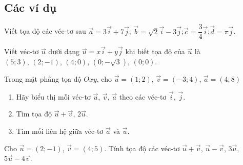 \subsection{Các ví dụ}
\begin{vd}%
Viết tọa độ các véc-tơ sau
$\vec{a}=3\vec{i}+7\vec{j}$; \quad $\vec{b}=\sqrt{2}\vec{i}-3\vec{j}$;\quad $\vec{c}=\dfrac{3}{4}\vec{i}$;\quad$\vec{d}=\pi\vec{j}$.
\end{vd}
\begin{vd}%
Viết véc-tơ $\vec{u}$ dưới dạng $\vec{u}=x\vec{i}+y\vec{j}$ khi biết tọa độ của $\vec{u}$ là\\
$(5;3)$, $(2;-1)$, $(4;0)$, $\left(0;-\sqrt{3}\right)$, $(0;0)$.
\end{vd}
\begin{vd}%
Trong mặt phẳng tọa độ $Oxy$, cho $\vec{u}=(1;2)$, $\vec{v}=(-3;4)$, $\vec{a}=(4;8)$
\begin{enumerate}
    \item Hãy biểu  thị mỗi véc-tơ $\vec{u}$, $\vec{v}$, $\vec{a}$ theo các véc-tơ $\vec{i}$, $\vec{j}$.
    \item Tìm tọa độ $\vec{u}+\vec{v}$, $2\vec{u}$.
    \item Tìm mối liên hệ giữa véc-tơ $\vec{a}$ và $\vec{u}$.
    \end{enumerate}
\end{vd}
\begin{vd}%
Cho $\vec{u}=(2;-1)$, $\vec{v}=(4;5)$. Tính tọa độ các véc-tơ $\vec{u}+\vec{v}$, $\vec{u}-\vec{v}$, $3\vec{u}$, $5\vec{u}-4\vec{v}$.
\end{vd}

